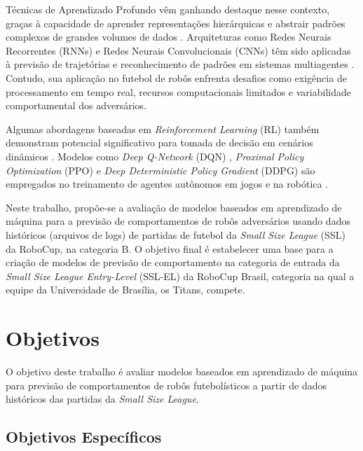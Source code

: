 Técnicas de Aprendizado Profundo vêm ganhando destaque nesse contexto, graças à capacidade de aprender representações hierárquicas e abstrair padrões complexos de grandes volumes de dados \cite{lecun2015deep}. Arquiteturas como Redes Neurais Recorrentes (RNNs) e Redes Neurais Convolucionais (CNNs) têm sido aplicadas à previsão de trajetórias e reconhecimento de padrões em sistemas multiagentes \cite{goodfellow2016deep}. Contudo, sua aplicação no futebol de robôs enfrenta desafios como exigência de processamento em tempo real, recursos computacionais limitados e variabilidade comportamental dos adversários.

Algumas abordagens baseadas em \textit{Reinforcement Learning} (RL) também demonstram potencial significativo para tomada de decisão em cenários dinâmicos \cite{sutton2018reinforcement}. Modelos como \textit{Deep Q-Network} (DQN) \cite{mnih2015human}, \textit{Proximal Policy Optimization} (PPO) \cite{schulman2017proximal} e \textit{Deep Deterministic Policy Gradient} (DDPG) \cite{lillicrap2015continuous} são empregados no treinamento de agentes autônomos em jogos \cite{silver2016mastering} e na robótica \cite{Kober2013}.

Neste trabalho, propõe-se a avaliação de modelos baseados em aprendizado de máquina para a previsão de comportamentos de robôs adversários usando dados históricos (arquivos de logs) de partidas de futebol da \textit{Small Size League} (SSL) da RoboCup, na categoria B. O objetivo final é estabelecer uma base para a criação de modelos de previsão de comportamento na categoria de entrada da \textit{Small Size League Entry-Level} (SSL-EL) da RoboCup Brasil, categoria na qual a equipe da Universidade de Brasília, os Titans, compete. 



\section{Objetivos}

O objetivo deste trabalho é avaliar modelos baseados em aprendizado de máquina para previsão de comportamentos de robôs futebolísticos a partir de dados históricos das partidas da \textit{Small Size League}.

\subsection{Objetivos Específicos}

